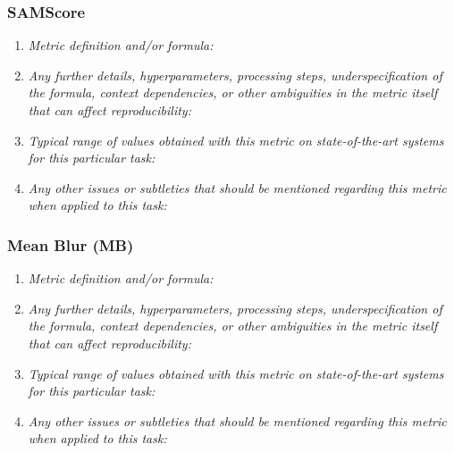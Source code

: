\documentclass[a4paper,11pt]{article}
\begin{document}
        \subsubsection{SAMScore}
            \begin{enumerate}[label=\alph*.]
                \item \textit{Metric definition and/or formula:}
                \bigskip
                \item \textit{Any further details, hyperparameters, processing steps, underspecification of the formula, context dependencies, or other ambiguities in the metric itself that can affect reproducibility:}
                \bigskip
                \item \textit{Typical range of values obtained with this metric on state-of-the-art systems for this particular task:}
                \bigskip
                \item \textit{Any other issues or subtleties that should be mentioned regarding this metric when applied to this task:}
                \bigskip
            \end{enumerate}
        \subsubsection{Mean Blur (MB)}
            \begin{enumerate}[label=\alph*.]
                \item \textit{Metric definition and/or formula:}
                \bigskip
                \item \textit{Any further details, hyperparameters, processing steps, underspecification of the formula, context dependencies, or other ambiguities in the metric itself that can affect reproducibility:}
                \bigskip
                \item \textit{Typical range of values obtained with this metric on state-of-the-art systems for this particular task:}
                \bigskip
                \item \textit{Any other issues or subtleties that should be mentioned regarding this metric when applied to this task:}
                \bigskip
            \end{enumerate}
\end{document}
